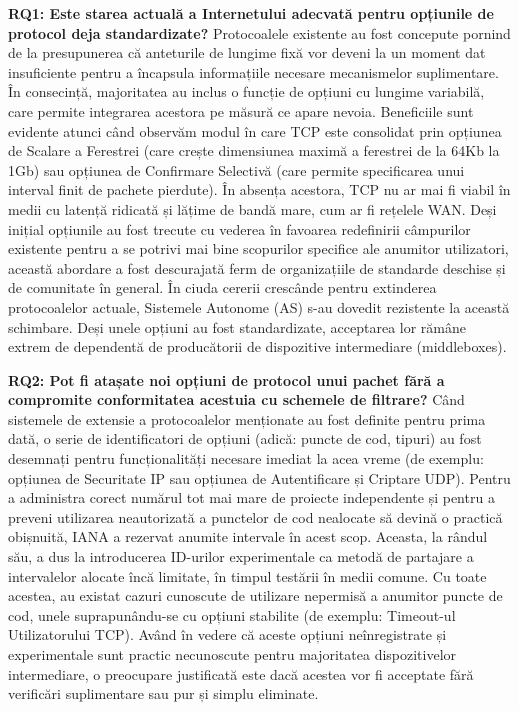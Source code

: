 \textbf{RQ1: Este starea actuală a Internetului adecvată pentru opțiunile de protocol deja standardizate?}
Protocoalele existente au fost concepute pornind de la presupunerea că anteturile de lungime fixă vor deveni la un moment dat insuficiente pentru a încapsula informațiile necesare mecanismelor suplimentare. În consecință, majoritatea au inclus o funcție de opțiuni cu lungime variabilă, care permite integrarea acestora pe măsură ce apare nevoia. Beneficiile sunt evidente atunci când observăm modul în care TCP este consolidat prin opțiunea de Scalare a Ferestrei (care crește dimensiunea maximă a ferestrei de la 64Kb la 1Gb) sau opțiunea de Confirmare Selectivă (care permite specificarea unui interval finit de pachete pierdute). În absența acestora, TCP nu ar mai fi viabil în medii cu latență ridicată și lățime de bandă mare, cum ar fi rețelele WAN. Deși inițial opțiunile au fost trecute cu vederea în favoarea redefinirii câmpurilor existente pentru a se potrivi mai bine scopurilor specifice ale anumitor utilizatori, această abordare a fost descurajată ferm de organizațiile de standarde deschise și de comunitate în general. În ciuda cererii crescânde pentru extinderea protocoalelor actuale, Sistemele Autonome (AS) s-au dovedit rezistente la această schimbare. Deși unele opțiuni au fost standardizate, acceptarea lor rămâne extrem de dependentă de producătorii de dispozitive intermediare (middleboxes).

\textbf{RQ2: Pot fi atașate noi opțiuni de protocol unui pachet fără a compromite conformitatea acestuia cu schemele de filtrare?}
Când sistemele de extensie a protocoalelor menționate au fost definite pentru prima dată, o serie de identificatori de opțiuni (adică: puncte de cod, tipuri) au fost desemnați pentru funcționalități necesare imediat la acea vreme (de exemplu: opțiunea de Securitate IP sau opțiunea de Autentificare și Criptare UDP). Pentru a administra corect numărul tot mai mare de proiecte independente și pentru a preveni utilizarea neautorizată a punctelor de cod nealocate să devină o practică obișnuită, IANA a rezervat anumite intervale în acest scop. Aceasta, la rândul său, a dus la introducerea ID-urilor experimentale ca metodă de partajare a intervalelor alocate încă limitate, în timpul testării în medii comune. Cu toate acestea, au existat cazuri cunoscute de utilizare nepermisă a anumitor puncte de cod, unele suprapunându-se cu opțiuni stabilite (de exemplu: Timeout-ul Utilizatorului TCP). Având în vedere că aceste opțiuni neînregistrate și experimentale sunt practic necunoscute pentru majoritatea dispozitivelor intermediare, o preocupare justificată este dacă acestea vor fi acceptate fără verificări suplimentare sau pur și simplu eliminate.

